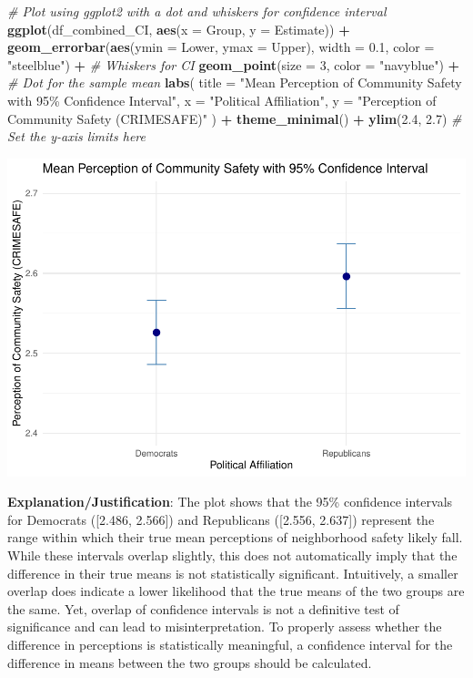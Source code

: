 \documentclass[
  11pt,
]{article}
\newenvironment{Shaded}{\begin{snugshade}}{\end{snugshade}}
\newcommand{\AttributeTok}[1]{\textcolor[rgb]{0.13,0.29,0.53}{#1}}
\newcommand{\CommentTok}[1]{\textcolor[rgb]{0.56,0.35,0.01}{\textit{#1}}}
\newcommand{\DecValTok}[1]{\textcolor[rgb]{0.00,0.00,0.81}{#1}}
\newcommand{\FloatTok}[1]{\textcolor[rgb]{0.00,0.00,0.81}{#1}}
\newcommand{\FunctionTok}[1]{\textcolor[rgb]{0.13,0.29,0.53}{\textbf{#1}}}
\newcommand{\NormalTok}[1]{#1}
\newcommand{\SpecialCharTok}[1]{\textcolor[rgb]{0.81,0.36,0.00}{\textbf{#1}}}
\newcommand{\StringTok}[1]{\textcolor[rgb]{0.31,0.60,0.02}{#1}}
\begin{document}
\begin{Shaded}
\begin{Highlighting}[]
\CommentTok{\# Plot using ggplot2 with a dot and whiskers for confidence interval}
\FunctionTok{ggplot}\NormalTok{(df\_combined\_CI, }\FunctionTok{aes}\NormalTok{(}\AttributeTok{x =}\NormalTok{ Group, }\AttributeTok{y =}\NormalTok{ Estimate)) }\SpecialCharTok{+}
  \FunctionTok{geom\_errorbar}\NormalTok{(}\FunctionTok{aes}\NormalTok{(}\AttributeTok{ymin =}\NormalTok{ Lower, }\AttributeTok{ymax =}\NormalTok{ Upper), }\AttributeTok{width =} \FloatTok{0.1}\NormalTok{, }\AttributeTok{color =} \StringTok{"steelblue"}\NormalTok{) }\SpecialCharTok{+}  \CommentTok{\# Whiskers for CI}
  \FunctionTok{geom\_point}\NormalTok{(}\AttributeTok{size =} \DecValTok{3}\NormalTok{, }\AttributeTok{color =} \StringTok{"navyblue"}\NormalTok{) }\SpecialCharTok{+}  \CommentTok{\# Dot for the sample mean}
  \FunctionTok{labs}\NormalTok{(}
    \AttributeTok{title =} \StringTok{"Mean Perception of Community Safety with 95\% Confidence Interval"}\NormalTok{,}
    \AttributeTok{x =} \StringTok{"Political Affiliation"}\NormalTok{,}
    \AttributeTok{y =} \StringTok{"Perception of Community Safety (CRIMESAFE)"}
\NormalTok{  ) }\SpecialCharTok{+}
  \FunctionTok{theme\_minimal}\NormalTok{() }\SpecialCharTok{+}
  \FunctionTok{ylim}\NormalTok{(}\FloatTok{2.4}\NormalTok{, }\FloatTok{2.7}\NormalTok{)  }\CommentTok{\# Set the y{-}axis limits here}
\end{Highlighting}
\end{Shaded}

\includegraphics{Answers-PS3_files/figure-latex/q1-e-1.pdf}

\textbf{Explanation/Justification}: The plot shows that the 95\%
confidence intervals for Democrats ({[}2.486, 2.566{]}) and Republicans
({[}2.556, 2.637{]}) represent the range within which their true mean
perceptions of neighborhood safety likely fall. While these intervals
overlap slightly, this does not automatically imply that the difference
in their true means is not statistically significant. Intuitively, a
smaller overlap does indicate a lower likelihood that the true means of
the two groups are the same. Yet, overlap of confidence intervals is not
a definitive test of significance and can lead to misinterpretation. To
properly assess whether the difference in perceptions is statistically
meaningful, a confidence interval for the difference in means between
the two groups should be calculated.
\end{document}
